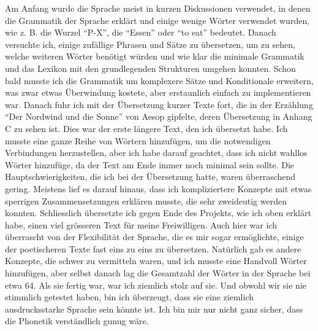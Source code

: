 \documentclass{article}
\begin{document}
Am Anfang wurde die Sprache meist in kurzen Diskussionen verwendet,
in denen die Grammatik der Sprache erklärt und einige wenige Wörter verwendet wurden,
wie z. B. die Wurzel ``P-X'', die ``Essen'' oder ``to eat'' bedeutet. Danach versuchte ich,
einige zufällige Phrasen und Sätze zu übersetzen, um zu sehen, welche weiteren Wörter benötigt würden
und wie klar die minimale Grammatik und das Lexikon mit den grundlegenden Strukturen umgehen konnten.
Schon bald musste ich die Grammatik um komplexere Sätze und Konditionale erweitern,
was zwar etwas Überwindung kostete, aber erstaunlich einfach zu implementieren war.
Danach fuhr ich mit der Übersetzung kurzer Texte fort, die in der Erzählung ``Der Nordwind und die Sonne''
von Aesop gipfelte, deren Übersetzung in Anhang C zu sehen ist. Dies war der erste längere Text,
den ich übersetzt habe. Ich musste eine ganze Reihe von Wörtern hinzufügen,
um die notwendigen Verbindungen herzustellen, aber ich habe darauf geachtet,
dass ich nicht wahllos Wörter hinzufüge, da der Text am Ende immer noch minimal sein sollte.
Die Hauptschwierigkeiten, die ich bei der Übersetzung hatte, waren überraschend gering.
Meistens lief es darauf hinaus, dass ich kompliziertere Konzepte mit etwas sperrigen Zusammensetzungen
erklären musste, die sehr zweideutig werden konnten. Schliesslich übersetzte ich gegen Ende des Projekts,
wie ich oben erklärt habe, einen viel grösseren Text für meine Freiwilligen. Auch hier war ich überrascht
von der Flexibilität der Sprache, die es mir sogar ermöglichte, einige der poetischeren Texte fast eins
zu eins zu übersetzen. Natürlich gab es andere Konzepte, die schwer zu vermitteln waren, und ich musste
eine Handvoll Wörter hinzufügen, aber selbst danach lag die Gesamtzahl der Wörter in der Sprache bei etwa 64.
Als sie fertig war, war ich ziemlich stolz auf sie. Und obwohl wir sie nie stimmlich getestet haben,
bin ich überzeugt, dass sie eine ziemlich ausdrucksstarke Sprache sein könnte ist. Ich bin mir nur nicht ganz sicher,
dass die Phonetik verständlich gunug wäre.
\end{document}

